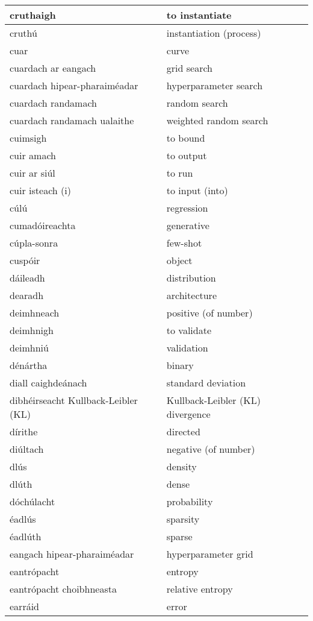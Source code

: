\begin{longtable}{|l|l|}
		cruthaigh&to instantiate\\ \hline 
		cruthú&instantiation (process)\\ \hline 
		cuar&curve\\ \hline 
		cuardach ar eangach&grid search\\ \hline 
		cuardach hipear-pharaiméadar&hyperparameter search\\ \hline 
		cuardach randamach&random search\\ \hline 
		cuardach randamach ualaithe&weighted random search\\ \hline 
		cuimsigh&to bound\\ \hline 
		cuir amach&to output\\ \hline 
		cuir ar siúl&to run\\ \hline 
		cuir isteach (i)&to input (into)\\ \hline 
		cúlú&regression\\ \hline 
		cumadóireachta&generative\\ \hline 
		cúpla-sonra&few-shot\\ \hline 
		cuspóir&object\\ \hline 
		dáileadh&distribution\\ \hline 
		dearadh&architecture\\ \hline 
		deimhneach&positive (of number)\\ \hline 
		deimhnigh&to validate\\ \hline 
		deimhniú&validation\\ \hline 
		dénártha&binary\\ \hline 
		diall caighdeánach&standard deviation\\ \hline 
		dibhéirseacht Kullback-Leibler (KL)&Kullback-Leibler (KL) divergence\\ \hline 
		dírithe&directed\\ \hline 
		diúltach&negative (of number)\\ \hline 
		dlús&density\\ \hline 
		dlúth&dense\\ \hline 
		dóchúlacht&probability\\ \hline 
		éadlús&sparsity\\ \hline 
		éadlúth&sparse\\ \hline 
		eangach hipear-pharaiméadar&hyperparameter grid\\ \hline 
		eantrópacht&entropy\\ \hline 
		eantrópacht choibhneasta&relative entropy\\ \hline 
		earráid&error\\ \hline 

\end{longtable}
